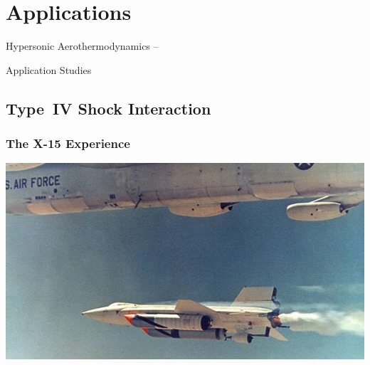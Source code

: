 \documentclass[compress,11pt]{beamer}
\begin{document}
\section{Applications}
\frame
{
  \vspace{4em}
  \centerline{\huge{Hypersonic Aerothermodynamics -- }}
  \vspace{.5em}
  
  \centerline{\huge{ Application Studies}}
}


\subsection{Type~IV Shock Interaction}
\frame
{
  \frametitle{\scriptsize The X-15 Experience}
  \vspace{-1.5em}
  \begin{center}
    \includegraphics[width=.71\textwidth]{figures/x15/x15-25} \\


\end{center}}
\end{document}
